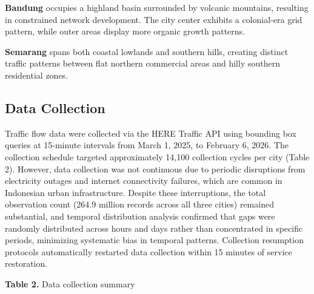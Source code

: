 \documentclass[12pt,a4paper]{article}
\begin{document}
\textbf{Bandung} occupies a highland basin surrounded by volcanic mountains, resulting in constrained network development. The city center exhibits a colonial-era grid pattern, while outer areas display more organic growth patterns.

\textbf{Semarang} spans both coastal lowlands and southern hills, creating distinct traffic patterns between flat northern commercial areas and hilly southern residential zones.

\subsection{Data Collection}

Traffic flow data were collected via the HERE Traffic API using bounding box queries at 15-minute intervals from March 1, 2025, to February 6, 2026. The collection schedule targeted approximately 14,100 collection cycles per city (Table 2). However, data collection was not continuous due to periodic disruptions from electricity outages and internet connectivity failures, which are common in Indonesian urban infrastructure. Despite these interruptions, the total observation count (264.9 million records across all three cities) remained substantial, and temporal distribution analysis confirmed that gaps were randomly distributed across hours and days rather than concentrated in specific periods, minimizing systematic bias in temporal patterns. Collection resumption protocols automatically restarted data collection within 15 minutes of service restoration.


\textbf{Table 2.} Data collection summary
\end{document}
